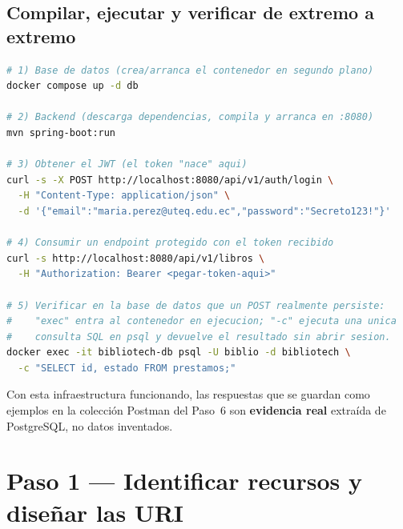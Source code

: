 \documentclass[11pt,a4paper]{article}
\begin{document}
\subsection{Compilar, ejecutar y verificar de extremo a extremo}

\begin{cajapaso}
\begin{lstlisting}[language=bash,numbers=none]
# 1) Base de datos (crea/arranca el contenedor en segundo plano)
docker compose up -d db

# 2) Backend (descarga dependencias, compila y arranca en :8080)
mvn spring-boot:run

# 3) Obtener el JWT (el token "nace" aqui)
curl -s -X POST http://localhost:8080/api/v1/auth/login \
  -H "Content-Type: application/json" \
  -d '{"email":"maria.perez@uteq.edu.ec","password":"Secreto123!"}'

# 4) Consumir un endpoint protegido con el token recibido
curl -s http://localhost:8080/api/v1/libros \
  -H "Authorization: Bearer <pegar-token-aqui>"

# 5) Verificar en la base de datos que un POST realmente persiste:
#    "exec" entra al contenedor en ejecucion; "-c" ejecuta una unica
#    consulta SQL en psql y devuelve el resultado sin abrir sesion.
docker exec -it bibliotech-db psql -U biblio -d bibliotech \
  -c "SELECT id, estado FROM prestamos;"
\end{lstlisting}
Con esta infraestructura funcionando, las respuestas que se guardan como ejemplos en la colección Postman del Paso~6 son \textbf{evidencia real} extraída de PostgreSQL, no datos inventados.
\end{cajapaso}

\section{Paso 1 --- Identificar recursos y diseñar las URI}
\end{document}

